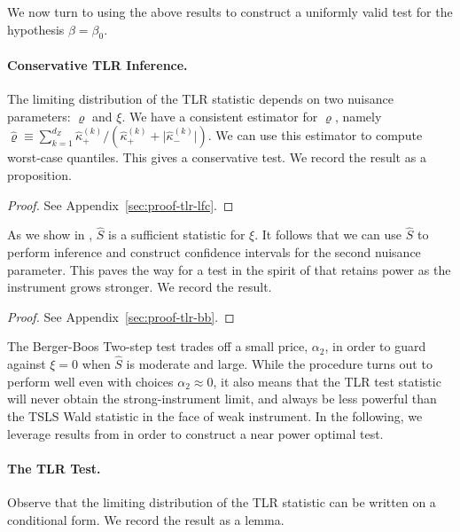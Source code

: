 \noindent 
We now turn to using the above results to
construct a uniformly valid test for the hypothesis \(\beta=\beta_0\).


\paragraph*{Conservative TLR Inference.}

The limiting distribution of the TLR statistic depends on two nuisance parameters: \(\varrho\) and \(\xi\). We have a consistent estimator for \(\varrho\), namely \(\hat \varrho\equiv \sum_{k=1}^{d_Z}\hat \kappa^{(k)}_{+}/(\hat\kappa^{(k)}_{+}+\lvert \hat\kappa^{(k)}_{-}\rvert)\). We can use this estimator to compute worst-case quantiles. This gives a conservative test. We record the result as a proposition.


\begin{proof}
    See Appendix~\ref{sec:proof-tlr-lfc}.
\end{proof}
\noindent 
As we show in , \(\hat S\) is a sufficient statistic for \(\xi\). It follows that we can use \(\hat S\) to perform inference and construct confidence intervals for the second nuisance parameter. This paves the way for a test in the spirit of \cite{bergerValuesMaximizedConfidence1994} that retains power as the instrument grows stronger.
We record the result.



\begin{proof}
    See Appendix~\ref{sec:proof-tlr-bb}.
\end{proof}
\noindent
The Berger-Boos Two-step test trades off a small price, \(\alpha_2\), in order to guard against \(\xi=0\) when \(\hat S\) is moderate and large. While the procedure turns out to perform well even with choices  \(\alpha_2 \approx 0\), it also means that the TLR test statistic will never obtain the strong-instrument limit, and always be less powerful than the TSLS Wald statistic in the face of weak instrument. In the following, we leverage results from \cite{elliottNearlyOptimalTests2015} in order to construct a near power optimal test.

\paragraph*{The TLR Test.}
Observe that the limiting distribution of the TLR statistic can be written on a conditional form. We record the result as a lemma.


